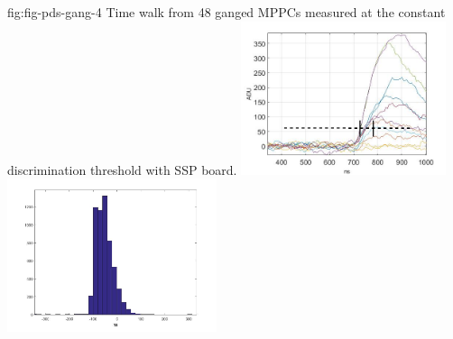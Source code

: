 \begin{dunefigure}
 {fig:fig-pds-gang-4}
 {Time walk from 48 ganged MPPCs measured at the constant discrimination threshold with SSP board.}
\includegraphics[height=4.5cm]{graphics/pds-gang-time_walk.jpg}
\includegraphics[height=4.5cm]{graphics/pds_gang_fig8.jpg}
\end{dunefigure}




